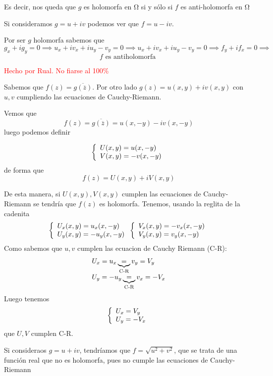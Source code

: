\begin{problem}[7]
Es decir, nos queda que $g$ es holomorfa en Ω si y sólo si $f$ es anti-holomorfa en Ω

\spart
{}

Si consideramos $g=u+iv$ podemos ver que $f=u-iv$.

Por ser $g$ holomorfa sabemos que
\[g_x+ig_y = 0 \implies u_x+iv_x+iu_y-v_y = 0\implies u_x+iv_x+iu_y-v_y = 0 \implies f_y+if_x=0 \implies\]
\[f \text{ es antiholomorfa }\]


\spart
\textcolor{red}{Hecho por Rual. No fiarse al 100\%}

Sabemos que $f(z) = \overline{g(\overline{z})}$. Por otro lado $g(z) = u(x,y)+iv(x,y)$ con $u,v$ cumpliendo las ecuaciones de Cauchy-Riemann.


Vemos que $$f(z) = \overline{g(\overline{z})} = u(x,-y)-iv(x,-y)$$ luego podemos definir

\begin{equation*}
\left\{
\begin{array}{l l}
U(x,y) = u(x,-y)\\
V(x,y) = -v(x,-y)\\
\end{array}
\right.
\end{equation*}
de forma que $$f(z) = U(x,y)+iV(x,y)$$

De esta manera, si $U(x,y), V(x,y)$ cumplen las ecuaciones de Cauchy-Riemann se tendría que $f(z)$ es holomorfa.
Tenemos, usando la reglita de la cadenita
\begin{equation*}
\left\{
\begin{array}{l l}
U_x(x,y) = u_x(x,-y)\\
U_y(x,y) = -u_y(x,-y)\\
\end{array}
\right.
\left\{
\begin{array}{l l}
V_x(x,y) = -v_x(x,-y)\\
V_y(x,y) = v_y(x,-y)\\
\end{array}
\right.
\end{equation*}
Como sabemos que $u,v$ cumplen las ecuacion de Cauchy Riemann (C-R):
\begin{equation*}
\begin{array}{l l}
U_x=u_x\underbrace{=}_{\text{C-R}}v_y=V_y\\
U_y=-u_y\underbrace{=}_{\text{C-R}}v_x=-V_x
\end{array}
\end{equation*}
Luego tenemos
\begin{equation*}
\left\{
\begin{array}{l l}
U_x=V_y\\
U_y=-V_x
\end{array}
\right.
\end{equation*}
que $U,V$ cumplen C-R.

\spart
{}

Si consideraos $g=u+iv$, tendríamos que $f=\sqrt{u^2+v^2}$, que se trata de una función real que no es holomorfa, pues no cumple las ecuaciones de Cauchy-Riemann

\end{problem}


